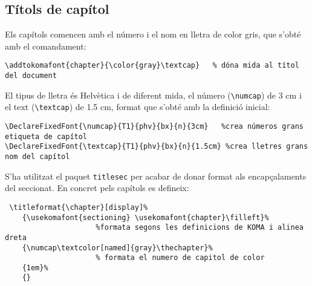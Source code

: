 \documentclass[a4paper,%
                             twoside,%
                             BCOR1.0cm,%
                             DIV11,%
                             parskip=full,%
                             11pt]{scrbook}
\begin{document}
\subsection{Títols de capítol}\label{sbsec:titcap}
Els capítols comencen amb el número i el nom en lletra de color gris, que s'obté amb el comandament:
\begin{scriptsize}
\begin{verbatim}
\addtokomafont{chapter}{\color{gray}\textcap}   % dóna mida al títol del document
\end{verbatim}
\end{scriptsize}
El tipus de lletra és Helvètica i de diferent mida, el número (\verb+\numcap+) de 3 cm i el text  (\verb+\textcap+)  de 1.5 cm, format que s'obté amb la definició inicial:
\begin{scriptsize}
\begin{verbatim}
\DeclareFixedFont{\numcap}{T1}{phv}{bx}{n}{3cm}   %crea números grans etiqueta de capítol
\DeclareFixedFont{\textcap}{T1}{phv}{bx}{n}{1.5cm} %crea lletres grans nom del capítol
\end{verbatim}
\end{scriptsize}
S'ha utilitzat el paquet \verb+titlesec+ per acabar de donar format als encapçalaments del seccionat. En concret pels capítols es defineix:
\begin{scriptsize}
\begin{verbatim}
 \titleformat{\chapter}[display]%              
    {\usekomafont{sectioning} \usekomafont{chapter}\filleft}% 
                     %formata segons les definicions de KOMA i alinea dreta
    {\numcap\textcolor[named]{gray}\thechapter}%                   
                     % formata el numero de capitol de color
    {1em}%
    {}
\end{verbatim}
\end{scriptsize}

\end{document}
